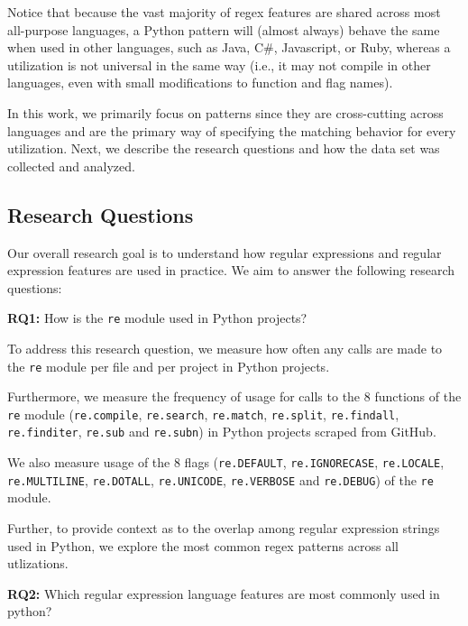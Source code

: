 Notice that because the vast majority of regex features are shared across most all-purpose languages, a Python {pattern} will (almost always) behave the same when used in other languages, such as Java, C\#, Javascript, or Ruby, whereas a utilization is not universal in the same way (i.e., it may not compile in other languages, even with small modifications to function and flag names).



In this work, we primarily focus on patterns since they are cross-cutting across languages and are the primary way of specifying the matching behavior for every utilization. Next, we describe the research questions and how the data set was collected and analyzed.

\subsection{Research Questions}
\label{sec:rqs}
Our overall research goal is to understand how regular expressions and regular expression features are used in practice. We aim to answer the following research questions:

\textbf{RQ1:} How  is the {\tt re} module used in Python projects?

To address this research question, we measure how often any calls are made to the {\tt re} module per file and per project in Python projects.

Furthermore, we measure the frequency of usage for calls to the 8 functions of the {\tt re} module ({\tt re.compile}, {\tt re.search}, {\tt re.match}, {\tt re.split}, {\tt re.findall}, {\tt re.finditer}, {\tt re.sub} and {\tt re.subn}) in Python projects scraped from GitHub.

We also measure usage of the 8 flags ({\tt re.DEFAULT}, {\tt re.IGNORECASE}, {\tt re.LOCALE}, {\tt re.MULTILINE}, {\tt re.DOTALL}, {\tt re.UNICODE}, {\tt re.VERBOSE} and {\tt re.DEBUG}) of the {\tt re} module.

Further, to provide context as to the overlap among regular expression strings used in Python, we explore the most common regex {patterns} across all utlizations.

\textbf{RQ2:} Which regular expression language features are most commonly used in python?

